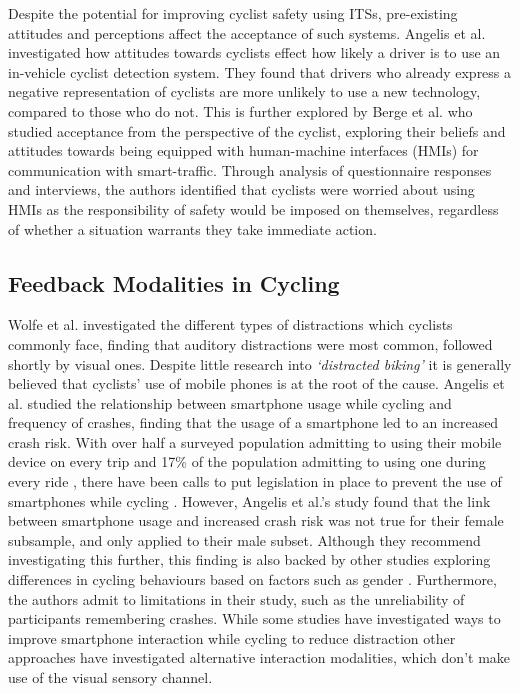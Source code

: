 \documentclass{interim}
\begin{document}
Despite the potential for improving cyclist safety using ITSs, pre-existing attitudes and perceptions affect the acceptance of such systems. Angelis et al. \cite{de2017negative} investigated how attitudes towards cyclists effect how likely a driver is to use an in-vehicle cyclist detection system. They found that drivers who already express a negative representation of cyclists are more unlikely to use a new technology, compared to those who do not. This is further explored by Berge et al. \cite{berge2022cyclists} who studied acceptance from the perspective of the cyclist, exploring their beliefs and attitudes towards being equipped with human-machine interfaces (HMIs) for communication with smart-traffic. Through analysis of questionnaire responses and interviews, the authors identified that cyclists were worried about using HMIs as the responsibility of safety would be imposed on themselves, regardless of whether a situation warrants they take immediate action. 


\subsection{Feedback Modalities in Cycling}
Wolfe et al. \cite{wolfe2016distracted} investigated the different types of distractions which cyclists commonly face, finding that auditory distractions were most common, followed shortly by visual ones. Despite little research into \textit{‘distracted biking’} \cite{mwakalonge2014distracted} it is generally believed that cyclists’ use of mobile phones is at the root of the cause. Angelis et al. \cite{doi:10.1080/19439962.2019.1591559} studied the relationship between smartphone usage while cycling and frequency of crashes, finding that the usage of a smartphone led to an increased crash risk. With over half a surveyed population admitting to using their mobile device on every trip \cite{GOLDENBELD20121} and 17\% of the population admitting to using one during every ride \cite{goldenbeld2010use}, there have been calls to put legislation in place to prevent the use of smartphones while cycling \cite{banphoneuse}. However, Angelis et al.'s study found that the link between smartphone usage and increased crash risk was not true for their female subsample, and only applied to their male subset. Although they recommend investigating this further, this finding is also backed by other studies exploring differences in cycling behaviours based on factors such as gender \cite{BEHNOOD201735}. Furthermore, the authors admit to limitations in their study, such as the unreliability of participants remembering crashes. While some studies have investigated ways to improve smartphone interaction while cycling to reduce distraction \cite{10.1145/3544548.3580971, 10.1145/3152832.3152871} other approaches have investigated alternative interaction modalities, which don’t make use of the visual sensory channel.
\end{document}
